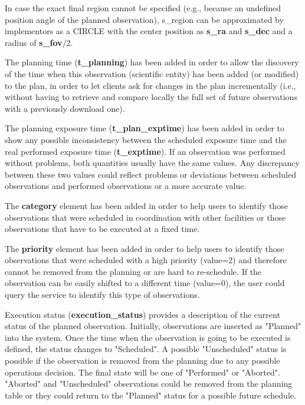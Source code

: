 \documentclass[11pt,a4paper]{ivoa}
\begin{document}
In case the exact final region cannot be specified (e.g., because an undefined
position angle of the planned observation), s\_region can be approximated by
implementors as a CIRCLE with the center position as \textbf{s\_ra} and
\textbf{s\_dec} and a radius of \textbf{s\_fov}/2.

The planning time (\textbf{t\_planning}) has been added in order to allow the
discovery of the time when this observation (scientific entity) has been added
(or modified) to the plan, in order to let clients ask for changes in the plan
incrementally (i.e., without having to retrieve and compare locally the full set
of future observations with a previously download one).

The planning exposure time (\textbf{t\_plan\_exptime}) has been added in order
to show any possible inconsistency between the scheduled exposure time and the
real performed exposure time (\textbf{t\_exptime}). If an observation was
performed without problems, both quantities usually have the same values. Any
discrepancy between these two values could reflect problems or deviations between
scheduled observations and performed observations or a more accurate value.

The \textbf{category} element has been added in order to help users to identify
those observations that were scheduled in coordination with other facilities or
those observations that have to be executed at a fixed time.

The \textbf{priority} element has been added in order to help users to identify
those observations that were scheduled with a high priority (value=2) and
therefore cannot be removed from the planning or are hard to re-schedule. If the
observation can be easily shifted to a different time (value=0), the user could
query the service to identify this type of observations.

Execution status (\textbf{execution\_status}) provides a description of the
current status of the planned observation. Initially, observations are
inserted as "Planned" into the system. Once the time when the observation is
going to be executed is defined, the status changes to "Scheduled". A possible
"Unscheduled" status is possible if the observation is removed from the planning
due to any possible operations decision. The final state will be one of
"Performed" or "Aborted". "Aborted" and "Unscheduled" observations could be
removed from the planning table or they could return to the "Planned" status
for a possible future schedule.
\end{document}
